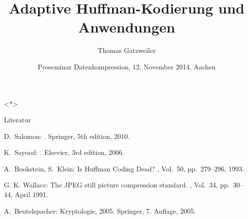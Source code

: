 \documentclass[xcolor=dvipsnames,presentation]{beamer}    %
\title[Huffman-Kodierung]{Adaptive Huffman-Kodierung und Anwendungen}
\author[Gatzweiler]{Thomas Gatzweiler}
\institute[RWTH Aachen University] %
{
  \strut Human Language Technology and Pattern Recognition\\
  \strut Lehrstuhl für Informatik VI\\
  \strut Computer Science Department\\
  \strut RWTH Aachen University, Germany
}
\date[12. November 2014]{Proseminar Datenkompression, 12. November 2014, Aachen}
\begin{document}
\nocite{*}

\begin{frame}[label=titlepage]
  \titlepage
\end{frame}


%

\begin{frame}<*>{}
  \tableofcontents[subsectionstyle=show/hide/hide]
\end{frame}




\begin{frame}[fragile]{Literatur}

  \begin{thebibliography}{}

D.~Salomon:
.
\newblock Springer, 5th edition, 2010.

K.~Sayood:
.
\newblock Elsevier, 3rd edition, 2006.

A.~Bookstein, S.~Klein: \newblock Is Huffman Coding Dead?
, Vol.~50, pp.~279--296, 1993.

G. K. Wallace: \newblock The {JPEG} still picture compression standard.
, Vol.~34, pp.~30--44, April 1991.

A.~Beutelspacher: \newblock Kryptologie, 2005.
\newblock Springer, 7. Auflage, 2005.
\end{thebibliography}

\end{frame}
\end{document}
